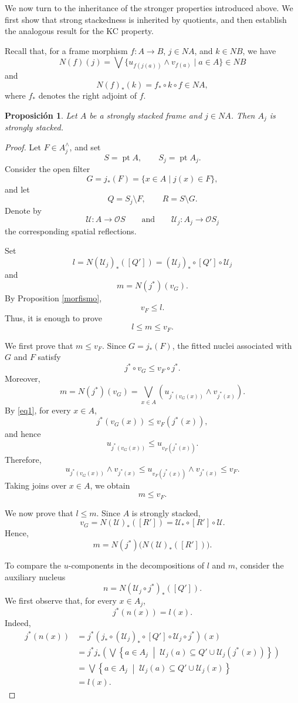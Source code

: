 \documentclass[11pt]{amsart}
\DeclareMathOperator{\pt}{pt}
\theoremstyle{plain}
\newtheorem{prop}[thm]{Proposición}
\theoremstyle{definition}
\begin{document}
We now turn to the inheritance of the stronger properties introduced
above. We first show that strong stackedness is inherited by quotients,
and then establish the analogous result for the KC property.

Recall that, for a frame morphism $f\colon A\to B$, $j\in NA$, and
$k\in NB$, we have
\[
N(f)(j)
=
\bigvee\{u_{f(j(a))}\wedge v_{f(a)}\mid a\in A\}
\in NB
\]
and
\[
N(f)_*(k)=f_*\circ k\circ f\in NA,
\]
where $f_*$ denotes the right adjoint of $f$.

\begin{prop}\label{Cocientefapilado}
Let $A$ be a strongly stacked frame and $j\in NA$. Then $A_j$ is strongly
stacked.
\end{prop}

\begin{proof}
Let $F\in A_j^\wedge$, and set
\[
S=\pt A,
\qquad
S_j=\pt A_j.
\]
Consider the open filter
\[
G=j_*(F)=\{x\in A\mid j(x)\in F\},
\]
and let
\[
Q=S_j\setminus F,
\qquad
R=S\setminus G.
\]
Denote by
\[
\mathcal{U}\colon A\longrightarrow\mathcal{O}S
\qquad\text{and}\qquad
\mathcal{U}_j\colon A_j\longrightarrow\mathcal{O}S_j
\]
the corresponding spatial reflections.

Set
\[
l=N(\mathcal{U}_j)_*([Q'])
=(\mathcal{U}_j)_*\circ[Q']\circ\mathcal{U}_j
\]
and
\[
m=N(j^*)(v_G).
\]
By Proposition \ref{morfismo},
\[
v_F\leq l.
\]
Thus, it is enough to prove
\[
l\leq m\leq v_F.
\]

We first prove that $m\leq v_F$. Since $G=j_*(F)$, the fitted nuclei
associated with $G$ and $F$ satisfy
\begin{equation}\label{eq1}
j^*\circ v_G\leq v_F\circ j^*.
\end{equation}
Moreover,
\[
m=N(j^*)(v_G)
=
\bigvee_{x\in A}
\left(
u_{j^*(v_G(x))}\wedge v_{j^*(x)}
\right).
\]
By \eqref{eq1}, for every $x\in A$,
\[
j^*(v_G(x))\leq v_F(j^*(x)),
\]
and hence
\[
u_{j^*(v_G(x))}
\leq
u_{v_F(j^*(x))}.
\]
Therefore,
\[
u_{j^*(v_G(x))}\wedge v_{j^*(x)}
\leq
u_{v_F(j^*(x))}\wedge v_{j^*(x)}
\leq v_F.
\]
Taking joins over $x\in A$, we obtain
\begin{equation}\label{eq2}
m\leq v_F.
\end{equation}

We now prove that $l\leq m$. Since $A$ is strongly stacked,
\[
v_G=N(\mathcal{U})_*([R'])
=\mathcal{U}_*\circ[R']\circ\mathcal{U}.
\]
Hence,
\[
m
=
N(j^*)\bigl(N(\mathcal{U})_*([R'])\bigr).
\]

To compare the $u$-components in the decompositions of $l$ and $m$, consider
the auxiliary nucleus
\[
n=N(\mathcal{U}_j\circ j^*)_*([Q']).
\]
We first observe that, for every $x\in A_j$,
\[
j^*(n(x))=l(x).
\]
Indeed,
\[
\begin{aligned}
j^*(n(x))
&=
j^*\left(
j_*\circ(\mathcal{U}_j)_*
\circ[Q']\circ\mathcal{U}_j\circ j^*
\right)(x)\\
&=
j^*j_*\left(
\bigvee
\left\{
a\in A_j
\;\middle|\;
\mathcal{U}_j(a)
\subseteq
Q'\cup\mathcal{U}_j(j^*(x))
\right\}
\right)\\
&=
\bigvee
\left\{
a\in A_j
\;\middle|\;
\mathcal{U}_j(a)
\subseteq
Q'\cup\mathcal{U}_j(x)
\right\}\\
&=l(x).
\end{aligned}
\]


\end{proof}
\end{document}
